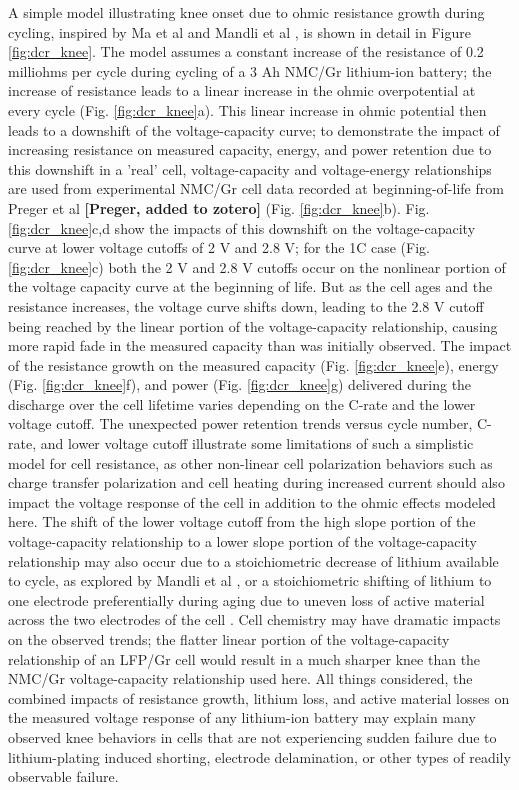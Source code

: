\documentclass[journal=jpcl, manuscript=article, layout=onecolumn]{achemso}
\begin{document}
A simple model illustrating knee onset due to ohmic resistance growth during cycling, inspired by Ma et al \cite{ma_editors_2019} and Mandli et al \cite{mandli_analysis_2019}, is shown in detail in Figure \ref{fig:dcr_knee}. The model assumes a constant increase of the resistance of 0.2 milliohms per cycle during cycling of a 3 Ah NMC/Gr lithium-ion battery; the increase of resistance leads to a linear increase in the ohmic overpotential at every cycle (Fig. \ref{fig:dcr_knee}a). This linear increase in ohmic potential then leads to a downshift of the voltage-capacity curve; to demonstrate the impact of increasing resistance on measured capacity, energy, and power retention due to this downshift in a 'real' cell, voltage-capacity and voltage-energy relationships are used from experimental NMC/Gr cell data recorded at beginning-of-life from Preger et al \textbf{[Preger, added to zotero]} (Fig. \ref{fig:dcr_knee}b). Fig. \ref{fig:dcr_knee}c,d show the impacts of this downshift on the voltage-capacity curve at lower voltage cutoffs of 2 V and 2.8 V; for the 1C case (Fig. \ref{fig:dcr_knee}c) both the 2 V and 2.8 V cutoffs occur on the nonlinear portion of the voltage capacity curve at the beginning of life. But as the cell ages and the resistance increases, the voltage curve shifts down, leading to the 2.8 V cutoff being reached by the linear portion of the voltage-capacity relationship, causing more rapid fade in the measured capacity than was initially observed. The impact of the resistance growth on the measured capacity (Fig. \ref{fig:dcr_knee}e), energy (Fig. \ref{fig:dcr_knee}f), and power (Fig. \ref{fig:dcr_knee}g) delivered during the discharge over the cell lifetime varies depending on the C-rate and the lower voltage cutoff. The unexpected power retention trends versus cycle number, C-rate, and lower voltage cutoff illustrate some limitations of such a simplistic model for cell resistance, as other non-linear cell polarization behaviors such as charge transfer polarization and cell heating during increased current should also impact the voltage response of the cell in addition to the ohmic effects modeled here. The shift of the lower voltage cutoff from the high slope portion of the voltage-capacity relationship to a lower slope portion of the voltage-capacity relationship may also occur due to a stoichiometric decrease of lithium available to cycle, as explored by Mandli et al \cite{mandli_analysis_2019}, or a stoichiometric shifting of lithium to one electrode preferentially during aging due to uneven loss of active material across the two electrodes of the cell \cite{lin_comprehensive_2013}. Cell chemistry may have dramatic impacts on the observed trends; the flatter linear portion of the voltage-capacity relationship of an LFP/Gr cell would result in a much sharper knee than the NMC/Gr voltage-capacity relationship used here. All things considered, the combined impacts of resistance growth, lithium loss, and active material losses on the measured voltage response of any lithium-ion battery may explain many observed knee behaviors in cells that are not experiencing sudden failure due to lithium-plating induced shorting, electrode delamination, or other types of readily observable failure.
\end{document}
